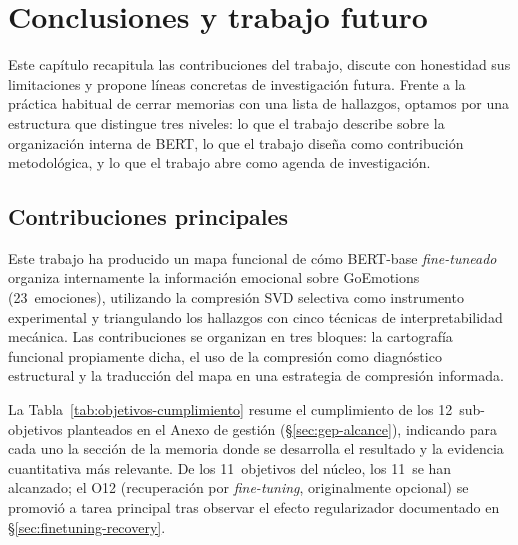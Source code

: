 
\section{Conclusiones y trabajo futuro}
\label{sec:conclusiones}

Este capítulo recapitula las contribuciones del trabajo, discute con
honestidad sus limitaciones y propone líneas concretas de investigación
futura. Frente a la práctica habitual de cerrar memorias con una lista de
hallazgos, optamos por una estructura que distingue tres niveles: lo que el
trabajo describe sobre la organización interna de BERT, lo que el
trabajo diseña como contribución metodológica, y lo que el trabajo
abre como agenda de investigación.


\subsection{Contribuciones principales}
\label{sec:contribuciones-finales}

Este trabajo ha producido un mapa funcional de cómo BERT-base
\emph{fine-tuneado} organiza internamente la información emocional sobre
GoEmotions (23~emociones), utilizando la compresión SVD selectiva como
instrumento experimental y triangulando los hallazgos con cinco técnicas
de interpretabilidad mecánica. Las contribuciones se organizan en tres
bloques: la cartografía funcional propiamente dicha, el uso de la
compresión como diagnóstico estructural y la traducción del mapa en una
estrategia de compresión informada.

La Tabla~\ref{tab:objetivos-cumplimiento} resume el cumplimiento de los
12~sub-objetivos planteados en el Anexo de gestión (\S\ref{sec:gep-alcance}),
indicando para cada uno la sección de la memoria donde se desarrolla el
resultado y la evidencia cuantitativa más relevante. De los 11~objetivos
del núcleo, los 11~se han alcanzado; el O12 (recuperación por
\emph{fine-tuning}, originalmente opcional) se promovió a tarea principal
tras observar el efecto regularizador documentado en
\S\ref{sec:finetuning-recovery}.

